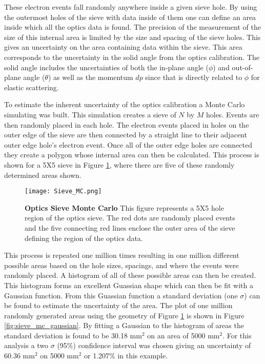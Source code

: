 These electron events fall randomly anywhere inside a given sieve hole. By using the outermost holes of the sieve with data inside of them one can define an area inside which all the optics data is found. The precision of the measurement of the size of this internal area is limited by the size and spacing of the sieve holes. This gives an uncertainty on the area containing data within the sieve. This area corresponds to the uncertainty in the solid angle from the optics calibration. The solid angle includes the uncertainties of both the in-plane angle ($\phi$) and out-of-plane angle ($\theta$) as well as the momentum $dp$ since that is directly related to $\phi$ for elastic scattering.  

To estimate the inherent uncertainty of the optics calibration a Monte Carlo simulating was built. This simulation creates a sieve of $N$ by $M$ holes. Events are then randomly placed in each hole. The electron events placed in holes on the outer edge of the sieve are then connected by a straight line to their adjacent outer edge hole's electron event. Once all of the outer edge holes are connected they create a polygon whose internal area can then be calculated. This process is shown for a 5X5 sieve in Figure \ref{fig:sieve_mc}, where there are five of these randomly determined areas shown. 

\begin{figure}[!ht]
\begin{center}
\texttt{[image: Sieve\_MC.png]}
\end{center}
\caption[Optics Sieve Monte Carlo]{
{\bf{Optics Sieve Monte Carlo}} This figure represents a 5X5 hole region of the optics sieve. The red dots are randomly placed events and the five connecting red lines enclose the outer area of the sieve defining the region of the optics data.}
\label{fig:sieve_mc}
\end{figure}

This process is repeated one million times resulting in one million different possible areas based on the hole sizes, spacings, and where the events were randomly placed. A histogram of all of these possible areas can then be created. This histogram forms an excellent Guassian shape which can then be fit with a Gaussian function. From this Guassian function a standard deviation (one $\sigma$) can be found to estimate the uncertainty of the area. The plot of one million randomly generated areas using the geometry of Figure \ref{fig:sieve_mc} is shown in Figure \ref{fig:sieve_mc_gaussian}. By fitting a Gaussian to the histogram of areas the standard deviation is found to be 30.18 mm$^2$ on an area of 5000 mm$^2$. For this analysis a two $\sigma$ (95$\%$) confidence interval was chosen giving an uncertainty of 60.36 mm$^2$ on 5000 mm$^2$ or 1.207$\%$ in this example. 

